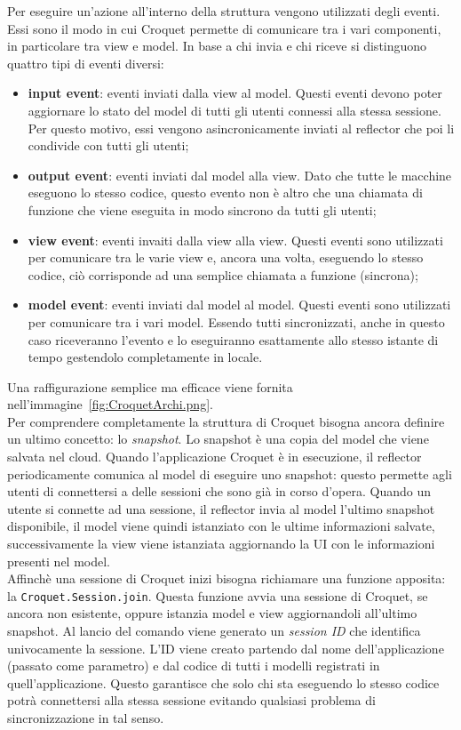 \newline
Per eseguire un'azione all'interno della struttura vengono utilizzati degli eventi. Essi sono il modo in cui Croquet permette di comunicare tra i vari componenti, in particolare
tra view e model. In base a chi invia e chi riceve si distinguono quattro tipi di eventi diversi:
\begin{itemize}
    \item \textbf{input event}: eventi inviati dalla view al model. Questi eventi devono poter aggiornare lo stato del model di tutti gli utenti connessi alla stessa sessione. Per 
    questo motivo, essi vengono asincronicamente inviati al reflector che poi li condivide con tutti gli utenti;
    \item \textbf{output event}: eventi inviati dal model alla view. Dato che tutte le macchine eseguono lo stesso codice, questo evento non è altro che una chiamata di funzione
    che viene eseguita in modo sincrono da tutti gli utenti;
    \item \textbf{view event}: eventi invaiti dalla view alla view. Questi eventi sono utilizzati per comunicare tra le varie view e, ancora una volta, eseguendo lo stesso codice,
    ciò corrisponde ad una semplice chiamata a funzione (sincrona);
    \item \textbf{model event}: eventi inviati dal model al model. Questi eventi sono utilizzati per comunicare tra i vari model. Essendo tutti sincronizzati, anche in questo caso
    riceveranno l'evento e lo eseguiranno esattamente allo stesso istante di tempo gestendolo completamente in locale.
\end{itemize}
Una raffigurazione semplice ma efficace viene fornita nell'immagine~\ref{fig:CroquetArchi.png}.\\
\newline
{}
Per comprendere completamente la struttura di Croquet bisogna ancora definire un ultimo concetto: lo \textit{snapshot}. Lo snapshot è una copia del model che viene salvata nel cloud.
Quando l'applicazione Croquet è in esecuzione, il reflector periodicamente comunica al model di eseguire uno snapshot: questo permette agli utenti di connettersi a delle sessioni che 
sono già in corso d'opera. Quando un utente si connette ad una sessione, il reflector invia al model l'ultimo snapshot disponibile, il model viene quindi istanziato con le ultime
informazioni salvate, successivamente la view viene istanziata aggiornando la UI con le informazioni presenti nel model.\\
\newline
Affinchè una sessione di Croquet inizi bisogna richiamare una funzione apposita: la \texttt{Croquet.Session.join}. Questa funzione avvia una sessione di Croquet, se ancora non esistente,
oppure istanzia model e view aggiornandoli all'ultimo snapshot. Al lancio del comando viene generato un \textit{session ID} che identifica univocamente la sessione. L'ID viene 
creato partendo dal nome dell'applicazione (passato come parametro) e dal codice di tutti i modelli registrati in quell'applicazione. Questo garantisce che solo chi sta eseguendo lo
stesso codice potrà connettersi alla stessa sessione evitando qualsiasi problema di sincronizzazione in tal senso.

